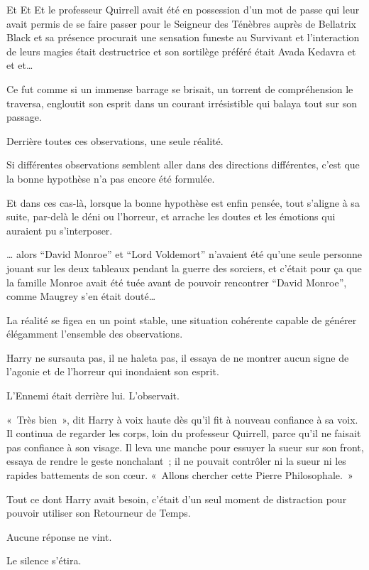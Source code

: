 \later

Et Et Et le professeur Quirrell avait été en possession d'un mot de passe qui leur avait permis de se faire passer pour le Seigneur des Ténèbres auprès de Bellatrix Black et sa présence procurait une sensation funeste au Survivant et l'interaction de leurs magies était destructrice et son sortilège préféré était Avada Kedavra et et et…

Ce fut comme si un immense barrage se brisait, un torrent de compréhension le traversa, engloutit son esprit dans un courant irrésistible qui balaya tout sur son passage.

Derrière toutes ces observations, une seule réalité.

Si différentes observations semblent aller dans des directions différentes, c'est que la bonne hypothèse n'a pas encore été formulée.

Et dans ces cas-là, lorsque la bonne hypothèse est enfin pensée, tout s'aligne à sa suite, par-delà le déni ou l'horreur, et arrache les doutes et les émotions qui auraient pu s'interposer.

… alors “David Monroe” et “Lord Voldemort” n'avaient été qu'une seule personne jouant sur les deux tableaux pendant la guerre des sorciers, et c'était pour ça que la famille Monroe avait été tuée avant de pouvoir rencontrer “David Monroe”, comme Maugrey s'en était douté…

La réalité se figea en un point stable, une situation cohérente capable de générer élégamment l'ensemble des observations.

Harry ne sursauta pas, il ne haleta pas, il essaya de ne montrer aucun signe de l'agonie et de l'horreur qui inondaient son esprit.

L'Ennemi était derrière lui. L'observait.

«~Très bien~», dit Harry à voix haute dès qu'il fit à nouveau confiance à sa voix. Il continua de regarder les corps, loin du professeur Quirrell, parce qu'il ne faisait pas confiance à son visage. Il leva une manche pour essuyer la sueur sur son front, essaya de rendre le geste nonchalant~; il ne pouvait contrôler ni la sueur ni les rapides battements de son cœur. «~Allons chercher cette Pierre Philosophale.~»

Tout ce dont Harry avait besoin, c'était d'un seul moment de distraction pour pouvoir utiliser son Retourneur de Temps.

Aucune réponse ne vint.

Le silence s'étira.

